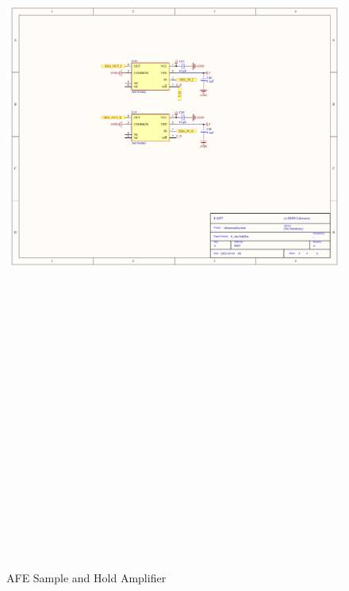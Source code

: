 \begin{landscape}
	\begin{figure}[htbp]
		\centering
		\includegraphics[width=20cm,height=28.7cm,keepaspectratio]{Figures/appendix/afe_altium/6_sha.pdf}
		\caption{AFE Sample and Hold Amplifier}
		\label{fig:appendix_6_sha}
	\end{figure}
\end{landscape}
